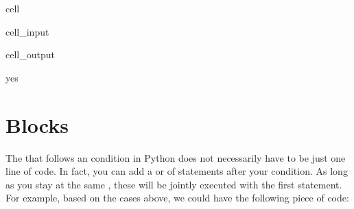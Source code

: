 \documentclass[letterpaper,10pt,english]{jupyterBook}
\begin{document}
\begin{sphinxuseclass}{cell}\begin{sphinxVerbatimInput}

\begin{sphinxuseclass}{cell_input}
\begin{sphinxVerbatim}[commandchars=\\\{\}]
             
\end{sphinxVerbatim}

\end{sphinxuseclass}\end{sphinxVerbatimInput}
\begin{sphinxVerbatimOutput}

\begin{sphinxuseclass}{cell_output}
\begin{sphinxVerbatim}[commandchars=\\\{\}]
yes
\end{sphinxVerbatim}

\end{sphinxuseclass}\end{sphinxVerbatimOutput}

\end{sphinxuseclass}

\section{Blocks}
\label{\detokenize{notebooks/03_ControlStructures/03_ControlStructures_student:blocks}}
\sphinxAtStartPar
The  that follows an  condition in Python does not necessarily have to be just one line of code. In fact, you can add a  or  of statements after your  condition. As long as you stay at the same , these will be jointly executed with the first statement. For example, based on the cases above, we could have the following piece of code:
\end{document}
